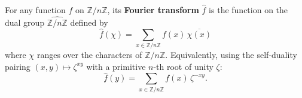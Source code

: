For any function $f$ on $\mathbb{Z}/n\mathbb{Z}$, its \textbf{Fourier transform} $\widehat{f}$ is the function on the dual group $\widehat{\mathbb{Z}/n\mathbb{Z}}$ defined by
$$\widehat{f}(\chi) = \sum_{x \in \mathbb{Z}/n\mathbb{Z}} f(x) \, \overline{\chi(x)}$$
where $\chi$ ranges over the characters of $\mathbb{Z}/n\mathbb{Z}$. Equivalently, using the self-duality pairing $(x, y) \mapsto \zeta^{xy}$ with a primitive $n$-th root of unity $\zeta$:
$$\widehat{f}(y) = \sum_{x \in \mathbb{Z}/n\mathbb{Z}} f(x) \, \zeta^{-xy}.$$
